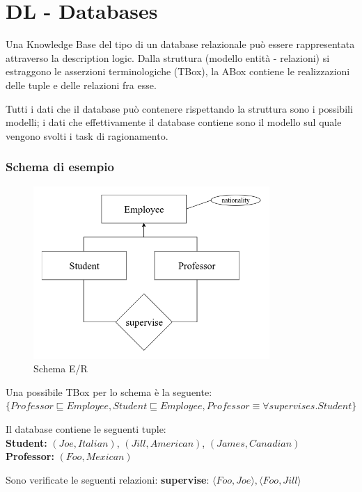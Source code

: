\chapter{DL - Databases}

Una Knowledge Base del tipo di un database relazionale può essere rappresentata attraverso la description logic. Dalla struttura (modello entità - relazioni) si estraggono le asserzioni terminologiche (TBox), la ABox contiene le realizzazioni delle tuple e delle relazioni fra esse.

Tutti i dati che il database può contenere rispettando la struttura sono i possibili modelli; i dati che effettivamente il database contiene sono il modello sul quale vengono svolti i task di ragionamento.

\subsection{Schema di esempio}

\begin{figure}[H]
\begin{center}
\includegraphics[width=0.8\textwidth]{er1.png}
\end{center}
\caption{Schema E/R}
\end{figure}

Una possibile TBox per lo schema è la seguente:
$\lbrace
Professor \sqsubseteq Employee,
Student \sqsubseteq Employee,
Professor \equiv \forall supervises. Student
\rbrace
$

Il database contiene le seguenti tuple:\\
\textbf{Student:} $(Joe, Italian)$, $(Jill, American)$, $(James, Canadian)$\\
\textbf{Professor:} $(Foo, Mexican)$

Sono verificate le seguenti relazioni:
\textbf{supervise}: $\langle Foo, Joe\rangle, \langle Foo, Jill\rangle$

